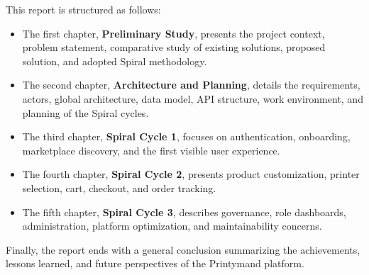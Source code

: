 This report is structured as follows:

\begin{itemize}
    \item The first chapter, \textbf{Preliminary Study}, presents the project context, problem statement, comparative study of existing solutions, proposed solution, and adopted Spiral methodology.
    \item The second chapter, \textbf{Architecture and Planning}, details the requirements, actors, global architecture, data model, API structure, work environment, and planning of the Spiral cycles.
    \item The third chapter, \textbf{Spiral Cycle 1}, focuses on authentication, onboarding, marketplace discovery, and the first visible user experience.
    \item The fourth chapter, \textbf{Spiral Cycle 2}, presents product customization, printer selection, cart, checkout, and order tracking.
    \item The fifth chapter, \textbf{Spiral Cycle 3}, describes governance, role dashboards, administration, platform optimization, and maintainability concerns.
\end{itemize}

Finally, the report ends with a general conclusion summarizing the achievements, lessons learned, and future perspectives of the Printymand platform.